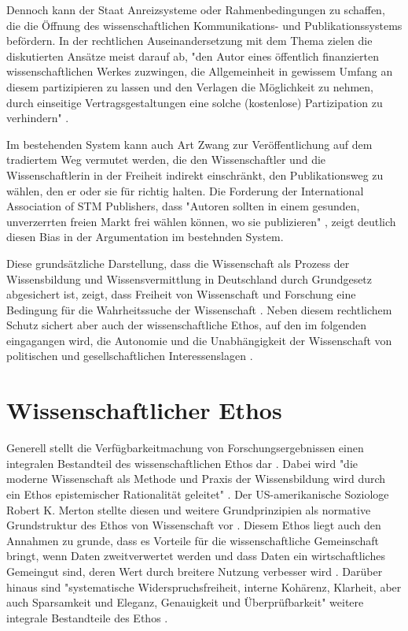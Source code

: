 Dennoch kann der Staat Anreizsysteme oder Rahmenbedingungen zu schaffen, die die Öffnung des wissenschaftlichen Kommunikations- und Publikationssystems befördern. In der rechtlichen Auseinandersetzung mit dem Thema zielen die diskutierten Ansätze meist darauf ab, "den Autor eines öffentlich finanzierten wissenschaftlichen Werkes zuzwingen, die Allgemeinheit in gewissem Umfang an diesem partizipieren zu lassen und den Verlagen die Möglichkeit zu nehmen, durch einseitige Vertragsgestaltungen eine solche (kostenlose) Partizipation zu verhindern" \cite{dorschel_2006_open}.

Im bestehenden System kann auch Art Zwang zur Veröffentlichung auf dem tradiertem Weg vermutet werden, die den Wissenschaftler und die Wissenschaftlerin in der Freiheit indirekt einschränkt, den Publikationsweg zu wählen, den er oder sie für richtig halten. Die Forderung der International Association of STM Publishers, dass "Autoren sollten in einem gesunden, unverzerrten freien Markt frei wählen können, wo sie publizieren" \cite{Brussels_Declaration_2007}, zeigt deutlich diesen Bias in der Argumentation im bestehnden System.

Diese grundsätzliche Darstellung, dass die Wissenschaft als Prozess der Wissensbildung und Wissensvermittlung in Deutschland durch Grundgesetz abgesichert ist, zeigt, dass Freiheit von Wissenschaft und Forschung eine Bedingung für die Wahrheitssuche der Wissenschaft \cite{Oezmen_2015}. Neben diesem rechtlichem Schutz sichert aber auch der wissenschaftliche Ethos, auf den im folgenden eingagangen wird, die Autonomie und die Unabhängigkeit der Wissenschaft von politischen und gesellschaftlichen Interessenslagen \cite{Oezmen_2015}.

\section{Wissenschaftlicher Ethos}

Generell stellt die Verfügbarkeitmachung von Forschungsergebnissen einen integralen Bestandteil des wissenschaftlichen Ethos dar \cite{Fangerau_2014}. Dabei wird "die moderne Wissenschaft als Methode und Praxis der Wissensbildung wird durch ein Ethos epistemischer Rationalität geleitet" \cite{Oezmen_2015}. Der US-amerikanische Soziologe Robert K. Merton stellte diesen und weitere Grundprinzipien als normative Grundstruktur des Ethos von Wissenschaft vor \cite{Merton_1985}. Diesem Ethos liegt auch den Annahmen zu grunde, dass es Vorteile für die wissenschaftliche Gemeinschaft bringt, wenn Daten zweitverwertet werden und dass Daten ein wirtschaftliches Gemeingut sind, deren Wert durch breitere Nutzung verbesser wird \cite{RIN_2010_open_research}. Darüber hinaus sind "systematische Widerspruchsfreiheit, interne Kohärenz, Klarheit, aber auch Sparsamkeit und Eleganz, Genauigkeit und Überprüfbarkeit" weitere integrale Bestandteile des Ethos \cite{Oezmen_2015}.

